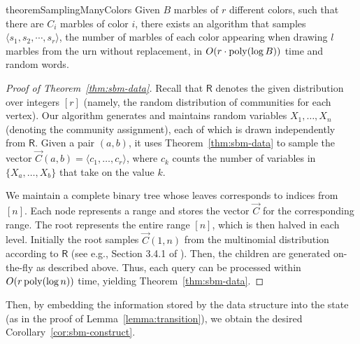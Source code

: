 \begin{restatable}{theorem}{SamplingManyColors}
\label{thm:SamplingManyColors}
Given $B$ marbles of $r$ different colors, such that there are $C_i$ marbles of color $i$,
there exists an algorithm that samples $\langle s_1, s_2,\cdots, s_r \rangle$,
the number of marbles of each color appearing when drawing $l$ marbles from the urn without replacement,
in $O(r\cdot\mathrm{poly}(\log B))$ time and random words.
\end{restatable}
\begin{proof}[Proof of Theorem~\ref{thm:sbm-data}]
Recall that $\mathsf{R}$ denotes the given distribution over integers $[r]$ (namely, the random distribution of communities for each vertex).
Our algorithm generates and maintains random variables $X_1, \ldots, X_n$ (denoting the community assignment),
each of which is drawn independently from $\mathsf{R}$.
Given a pair $(a, b)$, it uses Theorem~\ref{thm:sbm-data} to sample the vector $\vec{C}(a, b) = \langle c_1, \ldots, c_r \rangle$,
where $c_k$ counts the number of variables in $\{X_a, \ldots, X_b\}$ that take on the value $k$.

We maintain a complete binary tree whose leaves corresponds to indices from $[n]$.
Each node represents a range and stores the vector $\vec{C}$ for the corresponding range.
The root represents the entire range $[n]$, which is then halved in each level.
Initially the root samples $\vec{C}(1, n)$ from the multinomial distribution according to $\mathsf{R}$
(see e.g., Section 3.4.1 of \cite{knuth}).
Then, the children are generated on-the-fly as described above.
Thus, each query can be processed within $O(r\,\mathrm{poly}(\log n))$ time, yielding Theorem~\ref{thm:sbm-data}.
\end{proof}

Then, by embedding the information stored by the data structure into the state (as in the proof of Lemma~\ref{lemma:transition}),
we obtain the desired Corollary~\ref{cor:sbm-construct}.
